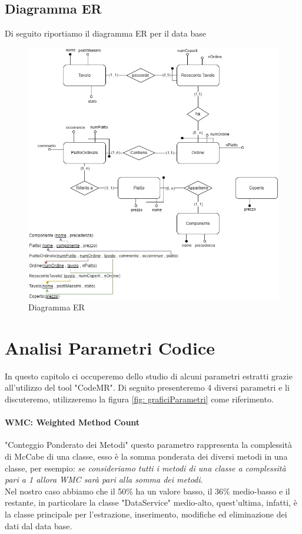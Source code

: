 \documentclass[12pt, letterpaper]{book}
\begin{document}
\section{Diagramma ER}
Di seguito riportiamo il diagramma ER per il data base
\begin{figure}[h]
    \centering
    \includegraphics[width =0.99 \linewidth]{../Diagrammi Data Base/DiagrammaER.jpg}
    \caption{Diagramma ER}
    \label{DB: ER}
\end{figure}


\chapter{Analisi Parametri Codice}
In questo capitolo ci occuperemo dello studio di alcuni parametri estratti grazie all'utilizzo del tool "CodeMR". Di seguito presenteremo 4 diversi parametri e li discuteremo, utilizzeremo la figura \ref{fig: graficiParametri} come riferimento. 
\subsubsection*{WMC: Weighted Method Count}
"Conteggio Ponderato dei Metodi" questo parametro rappresenta la complessità di McCabe di una classe, esso è la somma ponderata dei diversi metodi in una classe, per esempio: \textit{se consideriamo tutti i metodi di una classe a complessità pari a 1 allora WMC sarà pari alla somma dei metodi}.\\
Nel nostro caso abbiamo che il 50\% ha un valore basso, il 36\% medio-basso e il restante, in particolare la classe "DataService" medio-alto, quest'ultima, infatti, è la classe principale per l'estrazione, inserimento, modifiche ed eliminazione dei dati dal data base.
\end{document}
